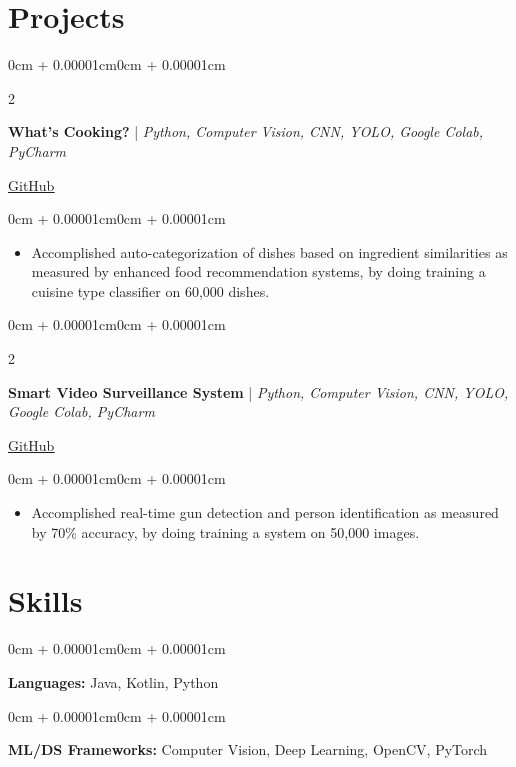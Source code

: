 \documentclass[10pt, letterpaper]{article}
\newenvironment{highlights}{
    \begin{itemize}[
        topsep=0.10cm,
        parsep=0.10cm,
        partopsep=0pt,
        itemsep=0pt,
        leftmargin=0cm + 10pt
    ]
}{
    \end{itemize}
}
\newenvironment{onecolentry}{
    \begin{adjustwidth}{0cm + 0.00001cm}{0cm + 0.00001cm}
}{
    \end{adjustwidth}
}
\newenvironment{twocolentry}[2][]{
    \onecolentry
    \def\secondColumn{#2}
    \setcolumnwidth{\fill, 5cm}
    \begin{paracol}{2}
}{
    \switchcolumn \raggedleft \secondColumn
    \end{paracol}
    \endonecolentry
}
\begin{document}
\section{Projects}
\begin{twocolentry}{\href{https://github.com/syed-rayyanadil/What-is-Cooking}{\underline{GitHub}}}
    \textbf{What's Cooking?} | \textit{Python, Computer Vision, CNN, YOLO, Google Colab, PyCharm}
\end{twocolentry}
\vspace{0.10cm}
\begin{onecolentry}
\begin{highlights}
    \item Accomplished auto-categorization of dishes based on ingredient similarities as measured by enhanced food recommendation systems, by doing training a cuisine type classifier on 60,000 dishes.
\end{highlights}
\end{onecolentry}

\vspace{0.3cm}

\begin{twocolentry}{\href{https://github.com/syed-rayyanadil/Smart-Video-Surveillance-System}{\underline{GitHub}}}
    \textbf{Smart Video Surveillance System} | \textit{Python, Computer Vision, CNN, YOLO, Google Colab, PyCharm}
\end{twocolentry}
\vspace{0.10cm}
\begin{onecolentry}
\begin{highlights}
    \item Accomplished real-time gun detection and person identification as measured by 70\% accuracy, by doing training a system on 50,000 images.
\end{highlights}
\end{onecolentry}

\section{Skills}
\begin{onecolentry}
    \textbf{Languages:} Java, Kotlin, Python
\end{onecolentry}

\vspace{0.1cm}

\begin{onecolentry}
    \textbf{ML/DS Frameworks:} Computer Vision, Deep Learning, OpenCV, PyTorch
\end{onecolentry}
\end{document}
